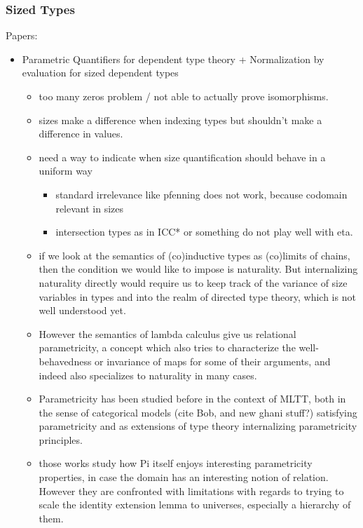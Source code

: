 \documentclass{book}
\begin{document}
\subsubsection{Sized Types}
Papers:
\begin{itemize}
\item Parametric Quantifiers for dependent type theory + Normalization by evaluation for sized dependent types
    \begin{itemize}
    \item too many zeros problem / not able to actually prove isomorphisms.
    \item sizes make a difference when indexing types but shouldn't make a difference in values.
    \item need a way to indicate when size quantification should behave in a uniform way
      \begin{itemize}
      \item standard irrelevance like pfenning does not work, because codomain relevant in sizes
      \item intersection types as in ICC* or something do not play well with eta.
      \end{itemize}

    \item if we look at the semantics of (co)inductive types as (co)limits
    of chains, then the condition we would like to impose is
    naturality. But internalizing naturality directly would require us
    to keep track of the variance of size variables in types and into
    the realm of directed type theory, which is not well understood
    yet.

    \item However the semantics of lambda calculus give us relational
    parametricity, a concept which also tries to characterize the
    well-behavedness or invariance of maps for some of their
    arguments, and indeed also specializes to naturality in many cases.

    \item Parametricity has been studied before in the context of MLTT,
    both in the sense of categorical models (cite Bob, and new ghani
    stuff?) satisfying parametricity and as extensions of type theory
    internalizing parametricity principles.

    \item those works study how Pi itself enjoys interesting parametricity
    properties, in case the domain has an interesting notion of
    relation. However they are confronted with limitations with
    regards to trying to scale the identity extension lemma to
    universes, especially a hierarchy of them.


\end{itemize}
\end{itemize}
\end{document}

